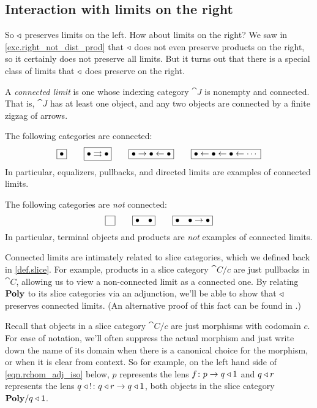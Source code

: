 \documentclass[Book-Poly]{subfiles}
\begin{document}
\subsection{Interaction with limits on the right} \label{subsec.comon.comp.prop.lim_right}

So $\mathbin{\triangleleft}$ preserves limits on the left.
How about limits on the right?
We saw in \cref{exc.right_not_dist_prod} that $\mathbin{\triangleleft}$ does not even preserve products on the right, so it certainly does not preserve all limits.
But it turns out that there is a special class of limits that $\mathbin{\triangleleft}$ does preserve on the right.

\begin{definition}
A \emph{connected limit} is one whose indexing category $\cat{J}$ is nonempty and connected. That is, $\cat{J}$ has at least one object, and any two objects are connected by a finite zigzag of arrows.
\end{definition}

\begin{example}
The following categories are connected:
\[
\fbox{$\bullet$}
\qquad
\fbox{$\bullet\rightrightarrows\bullet$}
\qquad
\fbox{$\bullet\to\bullet\leftarrow\bullet$}
\qquad
\fbox{$\bullet\leftarrow\bullet\leftarrow\bullet\leftarrow\cdots$}
\]
In particular, equalizers, pullbacks, and directed limits are examples of connected limits. 

The following categories are \emph{not} connected:
\[
\fbox{$\phantom{\bullet}$}
\qquad
\fbox{$\bullet\quad\bullet$}
\qquad
\fbox{$\bullet\quad\bullet\to \bullet$}
\]
In particular, terminal objects and products are \emph{not} examples of connected limits.
\end{example}

Connected limits are intimately related to slice categories, which we defined back in \cref{def.slice}.
For example, products in a slice category $\cat{C}/c$ are just pullbacks in $\cat{C}$, allowing us to view a non-connected limit as a connected one.
By relating $\mathbf{Poly}$ to its slice categories via an adjunction, we'll be able to show that $\mathbin{\triangleleft}$ preserves connected limits.
(An alternative proof of this fact can be found in \cite[Proposition 1.16]{kock2012polynomial}.)

Recall that objects in a slice category $\cat{C}/c$ are just morphisms with codomain $c$.
For ease of notation, we'll often suppress the actual morphism and just write down the name of its domain when there is a canonical choice for the morphism, or when it is clear from context.
So for example, on the left hand side of \eqref{eqn.rchom_adj_iso} below, $p$ represents the lens $f\colon p\to q\mathbin{\triangleleft} 1$ and $q\mathbin{\triangleleft} r$ represents the lens $q\:\mathbin{\triangleleft}\:!\colon q\mathbin{\triangleleft} r\to q\mathbin{\triangleleft}\textsf{1}$, both objects in the slice category $\mathbf{Poly}/q\mathbin{\triangleleft}\textsf{1}$.
\end{document}
